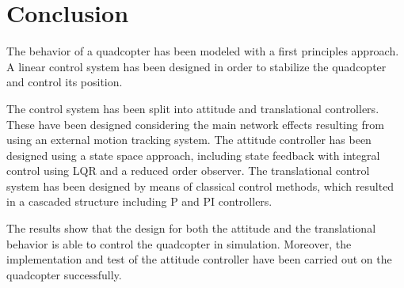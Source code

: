 \section{Conclusion}\label{sec:conclusion}

The behavior of a quadcopter has been modeled with a first principles approach. A linear control system has been designed in order to stabilize the quadcopter and control its position.

The control system has been split into attitude and translational controllers. These have been designed considering the main network effects resulting from using an external motion tracking system. The attitude controller has been designed using a state space approach, including state feedback with integral control using LQR and a reduced order observer. The translational control system has been designed by means of classical control methods, which resulted in a cascaded structure including P and PI controllers. 

The results show that the design for both the attitude and the translational behavior is able to control the quadcopter in simulation.
Moreover, the implementation and test of the attitude controller have been carried out on the quadcopter successfully. 